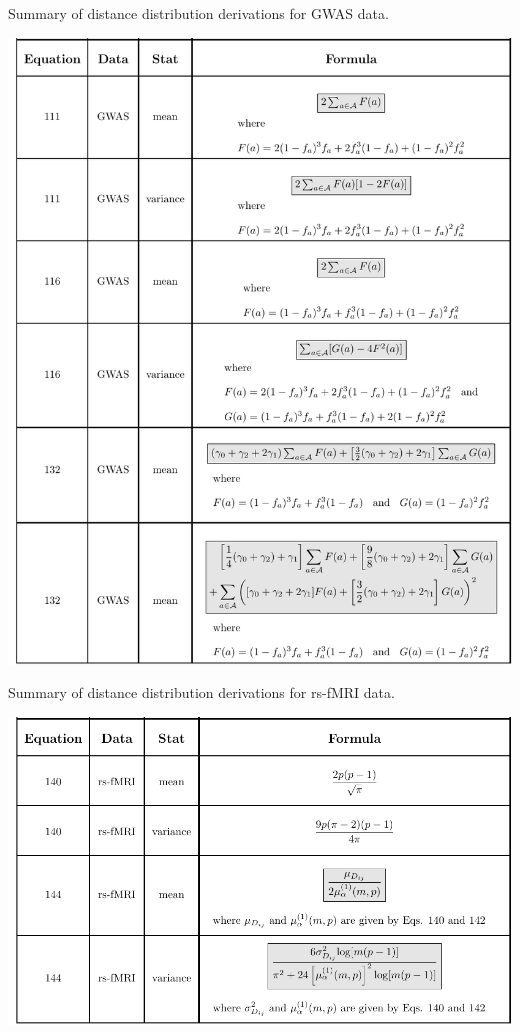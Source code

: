 \documentclass[10pt,letterpaper]{article}\usepackage[]{graphicx}\usepackage[]{color}
\begin{document}
\begin{table}[H]
\caption{Summary of distance distribution derivations for GWAS data.}
\label{tab:dist_distr_gwas}
\centering
\includegraphics[clip,trim=0.27cm 0.0cm 0.0cm 0.03cm,width=\textwidth]{updated_distributions_table-gwas(5-23-2019).pdf}
\end{table}

\begin{table}[H]
\caption{Summary of distance distribution derivations for rs-fMRI data.}
\label{tab:dist_distr_rs-fMRI}
\centering
\includegraphics[clip,trim=0.27cm 0.0cm 0.0cm 0.03cm,width=\textwidth]{updated_distributions_table-rs-fMRI.pdf}
\end{table}
\end{document}
